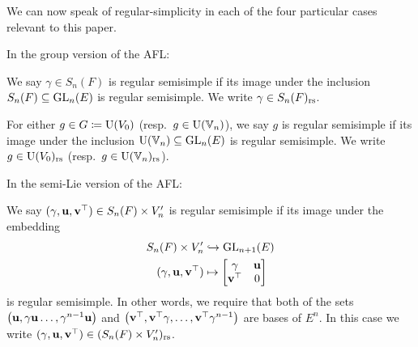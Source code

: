 We can now speak of regular-simplicity in each of the four
particular cases relevant to this paper.
\begin{definition}
  In the group version of the AFL:
  \begin{itemize}
    \ii We say $\gamma \in S_n(F)$ is regular semisimple
    if its image under the inclusion $S_n(F) \subseteq \operatorname{GL}_n(E)$ is regular semisimple.
    We write $\gamma \in S_n(F)_{\mathrm{rs}}$.

    \ii For either $g \in G \coloneqq \operatorname{U}(V_0)$ (resp.\ $g \in \operatorname{U}(\mathbb V_n)$),
    we say $g$ is regular semisimple
    if its image under the inclusion $\operatorname{U}(\mathbb V_n) \subseteq \operatorname{GL}_n(E)$ is regular semisimple.
    We write $g \in \operatorname{U}(V_0)_{\mathrm{rs}}$ (resp.\ $g \in \operatorname{U}(\mathbb V_n)_{\mathrm{rs}}$).
  \end{itemize}
  In the semi-Lie version of the AFL:
  \begin{itemize}
    \ii We say $(\gamma, \mathbf u, \mathbf v^\top) \in S_n(F) \times V_n'$
    is regular semisimple if its image under the embedding
    \begin{equation}
      \begin{aligned}
        S_n(F) \times V_n' &\hookrightarrow \operatorname{GL}_{n+1}(E) \\
        (\gamma, \mathbf u, \mathbf v^\top) &\mapsto \begin{bmatrix} \gamma & \mathbf u \\ \mathbf v^\top & 0 \end{bmatrix}
      \end{aligned}
      \label{eq:embed_FJ_analytic}
    \end{equation}
    is regular semisimple.
    In other words, we require that
    both of the sets
    $\left( \mathbf u, \gamma \mathbf u \dots, \gamma^{n-1}\mathbf u \right)$
    and
    $\left( \mathbf v^\top, \mathbf v^\top \gamma, \dots, \mathbf v^\top \gamma^{n-1} \right)$
    are bases of $E^n$.
    In this case we write $(\gamma, \mathbf u, \mathbf v^\top) \in (S_n(F) \times V_n')_{\mathrm{rs}}$.


\end{itemize}
\end{definition}
